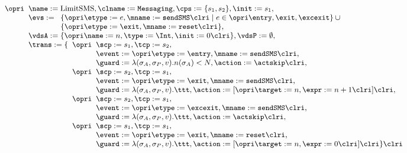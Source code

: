 \[
\small{
\begin{array}[t]{l}
\opri
\begin{array}[t]{l}
\name := \textrm{LimitSMS}, \clname := \texttt{Messaging},
\cps := \{s_1, s_2\},
\init := s_1,\\
\evs := 
\begin{array}[t]{l}
\{ \opri \etype := e, \mname := \texttt{sendSMS} \clri \mid e \in \opri \entry,
\exit, \excexit \} \:\cup \\
\{ \opri \etype := \exit, \mname := \texttt{reset} \clri\},
\end{array}
\\
\vdsA := \{\opri \name := n, \type := \Int, \init := 0 \clri\},
\vdsP := \emptyset,\\
\trans := \{
\begin{array}[t]{l}
\opri
 \begin{array}[t]{l}
\scp := s_1, \tcp := s_2, \\
             \event := \opri \etype := \entry,
                             \mname := \texttt{sendSMS} \clri, \\
             \guard := \lambda(\sigma_A, \sigma_P, v). n(\sigma_A) < N,
             \action := \actskip
            \clri,
\end{array}\\
\opri
 \begin{array}[t]{l}
\scp := s_2, \tcp := s_1, \\
             \event := \opri \etype := \exit,
                             \mname := \texttt{sendSMS} \clri, \\
             \guard := \lambda(\sigma_A, \sigma_P, v). \ttt, 
             \action := [\opri \target := n, \expr := n + 1 \clri]
            \clri,
\end{array}\\
\opri
 \begin{array}[t]{l}
\scp := s_2, \tcp := s_1, \\
             \event := \opri \etype := \excexit,
                             \mname := \texttt{sendSMS} \clri, \\
             \guard := \lambda(\sigma_A, \sigma_P, v). \ttt,
             \action := \actskip
            \clri,
\end{array}\\
\opri
\begin{array}[t]{l}
\scp := s_1, \tcp := s_1, \\
             \event := \opri \etype := \exit, \mname := \texttt{reset}
\clri, \\
             \guard := \lambda(\sigma_A, \sigma_P, v). \ttt, 
             \action := [\opri \target := n, \expr := 0 \clri]
           \clri \} \clri
\end{array}
\end{array}
\end{array}\\
\end{array}
}\]

